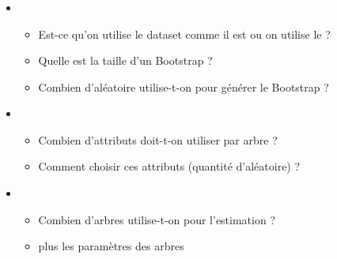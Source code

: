 \documentclass[xcolor=table]{beamer}
\begin{document}
\begin{frame}
	\frametitle{\insertsection}
	\framesubtitle{\insertsubsection}
	
	\begin{itemize}
		\item {}
		\begin{itemize}
			\item Est-ce qu'on utilise le dataset comme il est ou on utilise le  ?
			\item Quelle est la taille d'un Bootstrap ?
			\item Combien d'aléatoire utilise-t-on pour générer le Bootstrap ? 
		\end{itemize}
		\item {}
		\begin{itemize}
			\item Combien d'attributs doit-t-on utiliser par arbre ?
			\item Comment choisir ces attributs (quantité d'aléatoire) ?
		\end{itemize}
		\item {}
		\begin{itemize}
			\item Combien d'arbres utilise-t-on pour l'estimation ?
			\item plus les paramètres des arbres
		\end{itemize}
	\end{itemize}
	
\end{frame}

\end{document}
